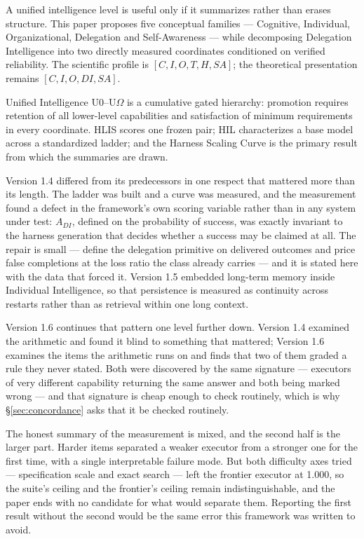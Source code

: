 \documentclass[11pt]{article}
\theoremstyle{definition}
\newcommand{\Om}{\ensuremath{\Omega}}
\begin{document}
A unified intelligence level is useful only if it summarizes rather than erases structure. This paper proposes five conceptual families --- Cognitive, Individual, Organizational, Delegation and Self-Awareness --- while decomposing Delegation Intelligence into two directly measured coordinates conditioned on verified reliability. The scientific profile is $[C, I, O, T, H, SA]$; the theoretical presentation remains $[C, I, O, DI, SA]$.

Unified Intelligence U0--U\Om{} is a cumulative gated hierarchy: promotion requires retention of all lower-level capabilities and satisfaction of minimum requirements in every coordinate. HLIS scores one frozen pair; HIL characterizes a base model across a standardized ladder; and the Harness Scaling Curve is the primary result from which the summaries are drawn.

Version 1.4 differed from its predecessors in one respect that mattered more than its length. The ladder was built and a curve was measured, and the measurement found a defect in the framework's own scoring variable rather than in any system under test: $A_{DI}$, defined on the probability of success, was exactly invariant to the harness generation that decides whether a success may be claimed at all. The repair is small --- define the delegation primitive on delivered outcomes and price false completions at the loss ratio the class already carries --- and it is stated here with the data that forced it. Version 1.5 embedded long-term memory inside Individual Intelligence, so that persistence is measured as continuity across restarts rather than as retrieval within one long context.

Version 1.6 continues that pattern one level further down. Version 1.4 examined the arithmetic and found it blind to something that mattered; Version 1.6 examines the items the arithmetic runs on and finds that two of them graded a rule they never stated. Both were discovered by the same signature --- executors of very different capability returning the same answer and both being marked wrong --- and that signature is cheap enough to check routinely, which is why \S\ref{sec:concordance} asks that it be checked routinely.

The honest summary of the measurement is mixed, and the second half is the larger part. Harder items separated a weaker executor from a stronger one for the first time, with a single interpretable failure mode. But both difficulty axes tried --- specification scale and exact search --- left the frontier executor at 1.000, so the suite's ceiling and the frontier's ceiling remain indistinguishable, and the paper ends with no candidate for what would separate them. Reporting the first result without the second would be the same error this framework was written to avoid.
\end{document}
